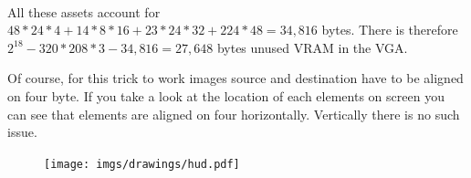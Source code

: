     \begin{minipage}{.3\textwidth}
  \end{minipage}
\begin{minipage}{.3\textwidth}
  \end{minipage}
\begin{minipage}{.3\textwidth}
  \end{minipage}
\par

    \begin{minipage}{.3\textwidth}
  \end{minipage}
\begin{minipage}{.3\textwidth}
  \end{minipage}
\begin{minipage}{.3\textwidth}
  \end{minipage}
\par


\begin{minipage}{.1\textwidth}
  \end{minipage}
\begin{minipage}{.1\textwidth}
  \end{minipage}
\begin{minipage}{.1\textwidth}
  \end{minipage}
\begin{minipage}{.1\textwidth}
  \end{minipage}
  \begin{minipage}{.3\textwidth}
  \end{minipage}
\begin{minipage}{.3\textwidth}
  \end{minipage}\


All these assets account for $48*24*4+14*8*16+23*24*32+224*48=34,816$ bytes. There is therefore $2^18-320*208*3 - 34,816=27,648$ bytes unused VRAM in the VGA.\\
\par
Of course, for this trick to work images source and destination have to be aligned on four byte. If you take a look at the location of each elements on screen you can see that elements are aligned on four horizontally. Vertically there is no such issue.
\begin{figure}[H]
  \centering
 \texttt{[image: imgs/drawings/hud.pdf]}
\end{figure}

